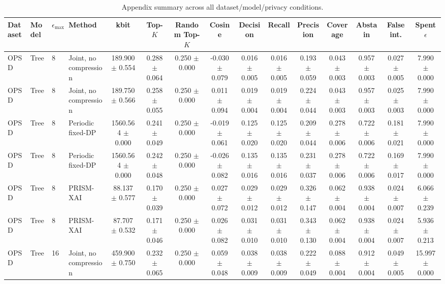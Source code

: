 \begin{table}[t]
\caption{Appendix summary across all dataset/model/privacy conditions.}
\label{tab:appendix-conditions}
\centering
\scriptsize
\setlength{\tabcolsep}{2.5pt}
\begin{tabular}{llllccccccccccc}
\toprule
Dataset & Model & $\epsilon_{\max}$ & Method & kbit & Top-$K$ & Random Top-$K$ & Cosine & Decision & Recall & Precision & Coverage & Abstain & False int. & Spent $\epsilon$ \\
\midrule
OPSD & Tree & 8 & Joint, no compression & 189.900 $\pm$ 0.554 & 0.288 $\pm$ 0.064 & 0.250 $\pm$ 0.000 & -0.030 $\pm$ 0.079 & 0.016 $\pm$ 0.005 & 0.016 $\pm$ 0.005 & 0.193 $\pm$ 0.059 & 0.043 $\pm$ 0.003 & 0.957 $\pm$ 0.003 & 0.027 $\pm$ 0.005 & 7.990 $\pm$ 0.000 \\
OPSD & Tree & 8 & Joint, no compression & 189.750 $\pm$ 0.566 & 0.258 $\pm$ 0.055 & 0.250 $\pm$ 0.000 & 0.011 $\pm$ 0.094 & 0.019 $\pm$ 0.004 & 0.019 $\pm$ 0.004 & 0.224 $\pm$ 0.044 & 0.043 $\pm$ 0.003 & 0.957 $\pm$ 0.003 & 0.025 $\pm$ 0.003 & 7.990 $\pm$ 0.000 \\
OPSD & Tree & 8 & Periodic fixed-DP & 1560.564 $\pm$ 0.000 & 0.241 $\pm$ 0.049 & 0.250 $\pm$ 0.000 & -0.019 $\pm$ 0.061 & 0.125 $\pm$ 0.020 & 0.125 $\pm$ 0.020 & 0.209 $\pm$ 0.044 & 0.278 $\pm$ 0.006 & 0.722 $\pm$ 0.006 & 0.181 $\pm$ 0.021 & 7.990 $\pm$ 0.000 \\
OPSD & Tree & 8 & Periodic fixed-DP & 1560.564 $\pm$ 0.000 & 0.242 $\pm$ 0.048 & 0.250 $\pm$ 0.000 & -0.026 $\pm$ 0.082 & 0.135 $\pm$ 0.016 & 0.135 $\pm$ 0.016 & 0.231 $\pm$ 0.037 & 0.278 $\pm$ 0.006 & 0.722 $\pm$ 0.006 & 0.169 $\pm$ 0.017 & 7.990 $\pm$ 0.000 \\
OPSD & Tree & 8 & PRISM-XAI & 88.137 $\pm$ 0.577 & 0.170 $\pm$ 0.039 & 0.250 $\pm$ 0.000 & 0.027 $\pm$ 0.072 & 0.029 $\pm$ 0.012 & 0.029 $\pm$ 0.012 & 0.326 $\pm$ 0.147 & 0.062 $\pm$ 0.004 & 0.938 $\pm$ 0.004 & 0.024 $\pm$ 0.007 & 6.066 $\pm$ 0.239 \\
OPSD & Tree & 8 & PRISM-XAI & 87.707 $\pm$ 0.532 & 0.171 $\pm$ 0.046 & 0.250 $\pm$ 0.000 & 0.026 $\pm$ 0.082 & 0.031 $\pm$ 0.010 & 0.031 $\pm$ 0.010 & 0.343 $\pm$ 0.130 & 0.062 $\pm$ 0.004 & 0.938 $\pm$ 0.004 & 0.024 $\pm$ 0.007 & 5.936 $\pm$ 0.213 \\
OPSD & Tree & 16 & Joint, no compression & 459.900 $\pm$ 0.750 & 0.232 $\pm$ 0.065 & 0.250 $\pm$ 0.000 & 0.059 $\pm$ 0.048 & 0.038 $\pm$ 0.009 & 0.038 $\pm$ 0.009 & 0.222 $\pm$ 0.049 & 0.088 $\pm$ 0.004 & 0.912 $\pm$ 0.004 & 0.049 $\pm$ 0.005 & 15.997 $\pm$ 0.000 \\

\end{tabular}
\end{table}
